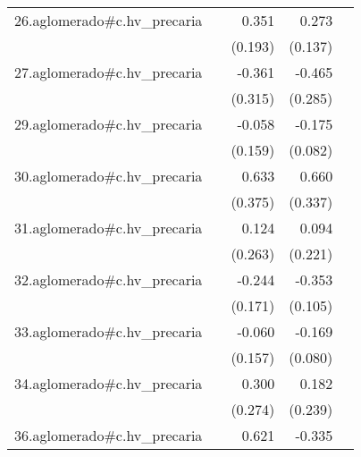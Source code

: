 {\begin{longtable}{l*{4}{D{.}{.}{-1}}}
\addlinespace
26.aglomerado#c.hv\_precaria&                     &       0.351         &       0.273\sym{*}  &                     \\
            &                     &     (0.193)         &     (0.137)         &                     \\
\addlinespace
27.aglomerado#c.hv\_precaria&                     &      -0.361         &      -0.465         &                     \\
            &                     &     (0.315)         &     (0.285)         &                     \\
\addlinespace
29.aglomerado#c.hv\_precaria&                     &      -0.058         &      -0.175\sym{*}  &                     \\
            &                     &     (0.159)         &     (0.082)         &                     \\
\addlinespace
30.aglomerado#c.hv\_precaria&                     &       0.633         &       0.660         &                     \\
            &                     &     (0.375)         &     (0.337)         &                     \\
\addlinespace
31.aglomerado#c.hv\_precaria&                     &       0.124         &       0.094         &                     \\
            &                     &     (0.263)         &     (0.221)         &                     \\
\addlinespace
32.aglomerado#c.hv\_precaria&                     &      -0.244         &      -0.353\sym{***}&                     \\
            &                     &     (0.171)         &     (0.105)         &                     \\
\addlinespace
33.aglomerado#c.hv\_precaria&                     &      -0.060         &      -0.169\sym{*}  &                     \\
            &                     &     (0.157)         &     (0.080)         &                     \\
\addlinespace
34.aglomerado#c.hv\_precaria&                     &       0.300         &       0.182         &                     \\
            &                     &     (0.274)         &     (0.239)         &                     \\
\addlinespace
36.aglomerado#c.hv\_precaria&                     &       0.621         &      -0.335         &                     \\

\end{longtable}}
